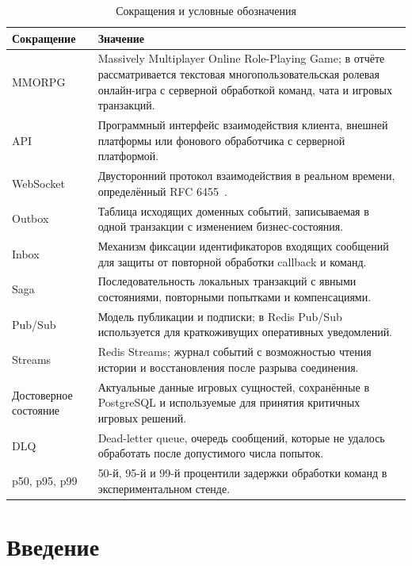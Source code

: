 \documentclass[a4paper,14pt]{extarticle}
\newcommand{\tablefont}{\scriptsize}
\renewcommand{\toprule}{\hline}
\renewcommand{\midrule}{\hline}
\renewcommand{\bottomrule}{\hline}
\numberwithin{figure}{section}
\numberwithin{table}{section}
\begin{document}
\begin{table}[H]
\centering
\caption*{Сокращения и условные обозначения}
\tablefont
\setlength{\tabcolsep}{3pt}
\renewcommand{\arraystretch}{1.15}
\begin{tabular}{|L{3.5cm}|L{11.0cm}|}
\toprule
Сокращение & Значение \\
\midrule
MMORPG & Massively Multiplayer Online Role-Playing Game; в отчёте рассматривается текстовая многопользовательская ролевая онлайн-игра с серверной обработкой команд, чата и игровых транзакций. \\
\hline
API & Программный интерфейс взаимодействия клиента, внешней платформы или фонового обработчика с серверной платформой. \\
\hline
WebSocket & Двусторонний протокол взаимодействия в реальном времени, определённый RFC 6455~\cite{rfc6455}. \\
\hline
Outbox & Таблица исходящих доменных событий, записываемая в одной транзакции с изменением бизнес-состояния. \\
\hline
Inbox & Механизм фиксации идентификаторов входящих сообщений для защиты от повторной обработки callback и команд. \\
\hline
Saga & Последовательность локальных транзакций с явными состояниями, повторными попытками и компенсациями. \\
\hline
Pub/Sub & Модель публикации и подписки; в Redis Pub/Sub используется для краткоживущих оперативных уведомлений. \\
\hline
Streams & Redis Streams; журнал событий с возможностью чтения истории и восстановления после разрыва соединения. \\
\hline
Достоверное состояние & Актуальные данные игровых сущностей, сохранённые в PostgreSQL и используемые для принятия критичных игровых решений. \\
\hline
DLQ & Dead-letter queue, очередь сообщений, которые не удалось обработать после допустимого числа попыток. \\
\hline
p50, p95, p99 & 50-й, 95-й и 99-й процентили задержки обработки команд в экспериментальном стенде. \\
\bottomrule
\end{tabular}
\end{table}

\clearpage
\section{Введение}
\label{sec:intro}
\end{document}
